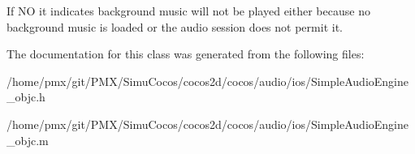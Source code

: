 If NO it indicates background music will not be played either because no background music is loaded or the audio session does not permit it. 

The documentation for this class was generated from the following files\+:\begin{DoxyCompactItemize}
\item 
/home/pmx/git/\+P\+M\+X/\+Simu\+Cocos/cocos2d/cocos/audio/ios/Simple\+Audio\+Engine\+\_\+objc.\+h\item 
/home/pmx/git/\+P\+M\+X/\+Simu\+Cocos/cocos2d/cocos/audio/ios/Simple\+Audio\+Engine\+\_\+objc.\+m\end{DoxyCompactItemize}
